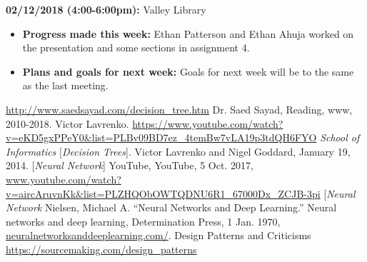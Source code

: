 \documentclass[a4paper]{article}
\begin{document}
\textbf{02/12/2018 (4:00-6:00pm):} Valley Library
\begin{itemize}
\item \textbf{Progress made this week:} Ethan Patterson and Ethan Ahuja worked on the presentation and some sections in assignment 4.
\item \textbf{Plans and goals for next week:} Goals for next week will be to the same as the last meeting.
\end{itemize}

\newpage %
\begin{thebibliography}{9}
\url{http://www.saedsayad.com/decision_tree.htm}
Dr. Saed Sayad, Reading, www, 2010-2018.
Victor Lavrenko.
\url{https://www.youtube.com/watch?v=eKD5gxPPeY0&list=PLBv09BD7ez_4temBw7vLA19p3tdQH6FYO}
\textit{School of Informatics} 
[\textit{Decision Trees}]. 
Victor Lavrenko and Nigel Goddard, January 19, 2014.
[\textit{Neural Network}]
YouTube, YouTube, 5 Oct. 2017, \url{www.youtube.com/watch?v=aircAruvnKk&list=PLZHQObOWTQDNU6R1_67000Dx_ZCJB-3pi}
[\textit{Neural Network}
Nielsen, Michael A. “Neural Networks and Deep Learning.” Neural networks and deep learning, Determination Press, 1 Jan. 1970,\url{ neuralnetworksanddeeplearning.com/}.
Design Patterns and Criticisms
\url{https://sourcemaking.com/design_patterns}
\end{thebibliography}
\end{document}
